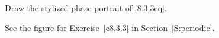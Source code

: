 \documentclass{ximera}
\begin{document}
\begin{exercise} \label{c8.4.4}
Draw the stylized phase portrait of \eqref{8.3.3eq}.

\begin{solution}
See the figure for Exercise~\ref{c8.3.3} in
Section~\ref{S:periodic}.

\end{solution}
\end{exercise}
\end{document}
